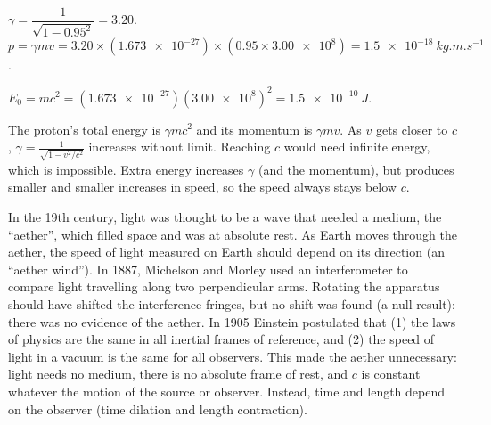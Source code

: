 \documentclass[12pt]{article}
\begin{document}
\ansq
{}
\begin{crit}
\end{crit}
\sample
$\gamma = \dfrac{1}{\sqrt{1 - 0.95^2}} = 3.20$. \quad
$p = \gamma m v = 3.20 \times (\num{1.673e-27}) \times (0.95 \times \num{3.00e8}) = \qty{1.5e-18}{kg.m.s^{-1}}$.
\begin{crit}
\end{crit}
\sample
$E_0 = mc^2 = (\num{1.673e-27})(\num{3.00e8})^2 = \qty{1.5e-10}{J}$.
\begin{crit}
\end{crit}
\sample
The proton's total energy is $\gamma mc^2$ and its momentum is $\gamma mv$. As $v$ gets closer to $c$,
$\gamma = \frac{1}{\sqrt{1 - v^2/c^2}}$ increases without limit. Reaching $c$ would need infinite energy,
which is impossible. Extra energy increases $\gamma$ (and the momentum), but produces smaller and smaller
increases in speed, so the speed always stays below $c$.

\ansq
\begin{crit}
\end{crit}
\sample
In the 19th century, light was thought to be a wave that needed a medium, the ``aether'', which filled
space and was at absolute rest. As Earth moves through the aether, the speed of light measured on Earth
should depend on its direction (an ``aether wind''). In 1887, Michelson and Morley used an interferometer
to compare light travelling along two perpendicular arms. Rotating the apparatus should have shifted the
interference fringes, but no shift was found (a null result): there was no evidence of the aether. In 1905
Einstein postulated that (1) the laws of physics are the same in all inertial frames of reference, and
(2) the speed of light in a vacuum is the same for all observers. This made the aether unnecessary: light
needs no medium, there is no absolute frame of rest, and $c$ is constant whatever the motion of the source
or observer. Instead, time and length depend on the observer (time dilation and length contraction).
\end{document}
